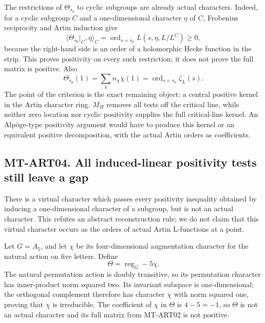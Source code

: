 The restrictions of $\Theta_{s_0}$ to cyclic subgroups are already actual
characters.  Indeed, for a cyclic subgroup $C$ and a one-dimensional
character $\eta$ of $C$, Frobenius reciprocity and Artin induction give
\[
 \langle\Theta_{s_0}|_C,\eta\rangle_C
   =\operatorname{ord}_{s=s_0}L(s,\eta,L/L^C)\ge0,
\]
because the right-hand side is an order of a holomorphic Hecke function in
the strip.  This proves positivity on every such restriction; it does not
prove the full matrix is positive.  Also
\[
 \Theta_{s_0}(1)=\sum_\chi n_\chi\chi(1)
   =\operatorname{ord}_{s=s_0}\zeta_L(s).
\]
The point of the criterion is the exact remaining object: a central
positive kernel in the Artin character ring.  $M_H$ removes all tests off
the critical line, while neither zero location nor cyclic positivity
supplies the full critical-line kernel.  An Alp\"oge-type positivity
argument would have to produce this kernel or an equivalent positive
decomposition, with the actual Artin orders as coefficients.

\subsection*{MT-ART04. All induced-linear positivity tests still leave a gap}
There is a virtual character which passes every positivity inequality
obtained by inducing a one-dimensional character of a subgroup, but is not
an actual character.  This refutes an abstract reconstruction rule; we do
not claim that this virtual character occurs as the orders of actual
Artin L-functions at a point.

Let $G=A_5$, and let $\chi$ be its four-dimensional augmentation character
for the natural action on five letters.  Define
\[
             \Theta=\operatorname{reg}_G-5\chi.
\]
The natural permutation action is doubly transitive, so its permutation
character has inner-product norm squared two.  Its invariant subspace is
one-dimensional; the orthogonal complement therefore has character
$\chi$ with norm squared one, proving that $\chi$ is irreducible.
The coefficient of $\chi$ in $\Theta$ is $4-5=-1$, so $\Theta$ is not an
actual character and its full matrix from MT-ART02 is not positive.

